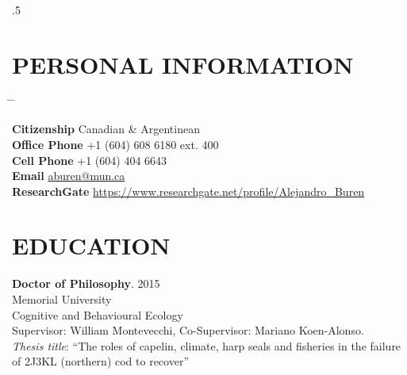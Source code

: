 \documentclass{res}
\begin{document}
 
\thispagestyle{empty} %
\address{Senior Fisheries Biologist\\
	Ecofish Research Ltd.\\
	\\	
	Research Scientist\\
Fisheries and Oceans Canada
}


\begin{resume}
\vspace{0.3in}
\moveleft.5\sectionwidth\centerline{ }  

\section{PERSONAL INFORMATION}

\parbox{0.5\textwidth}{ %
	\begin{tabbing} %
		\hspace{3cm} \= \hspace{4cm} \= \kill %
		
		{\bf Citizenship} \> Canadian \& Argentinean \\%
		
	    {\bf Office Phone} \> +1 (604) 608 6180 ext. 400 \\ %
		{\bf Cell Phone} \> +1 (604) 404 6643 \\ %
	
		{\bf Email} \> \href{mailto:aburen@mun.ca}{aburen@mun.ca}\\
		 
		{\bf ResearchGate} \> \url{https://www.researchgate.net/profile/Alejandro_Buren}
    \end{tabbing}
}
\hfill 

\section{EDUCATION}
\vspace{0.1in} 
 
\textbf{Doctor of Philosophy}. 2015 \\
Memorial University \\
Cognitive and Behavioural Ecology \\
Supervisor: William Montevecchi, Co-Supervisor: Mariano Koen-Alonso.\\
\textit{Thesis title}: “The roles of capelin, climate, harp seals and fisheries in the failure of 2J3KL (northern) cod to recover”


\end{resume}
\end{document}
